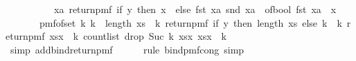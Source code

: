 \begin{isabellebody}
\ \ \ \ \ \ \ \ \ \ {\isacharparenleft}{\kern0pt}{\isasymlambda}xa{\isachardot}{\kern0pt}\ return{\isacharunderscore}{\kern0pt}pmf\ {\isacharparenleft}{\kern0pt}if\ y\ then\ {\isacharparenleft}{\kern0pt}x{\isacharcomma}{\kern0pt}\ {}{\isacharparenright}{\kern0pt}\ else\ {\isacharparenleft}{\kern0pt}fst\ xa{\isacharcomma}{\kern0pt}\ snd\ xa\ {\isacharplus}{\kern0pt}\ {\isacharparenleft}{\kern0pt}of{\isacharunderscore}{\kern0pt}bool\ {\isacharparenleft}{\kern0pt}fst\ xa\ {\isacharequal}{\kern0pt}\ x{\isacharparenright}{\kern0pt}{\isacharparenright}{\kern0pt}{\isacharparenright}{\kern0pt}{\isacharparenright}{\kern0pt}{\isacharparenright}{\kern0pt}{\isacharparenright}{\kern0pt}\isanewline
\ \ \ \ \ \ {\isacharequal}{\kern0pt}\ pmf{\isacharunderscore}{\kern0pt}of{\isacharunderscore}{\kern0pt}set\ {\isacharbraceleft}{\kern0pt}k{\isachardot}{\kern0pt}\ k\ {\isacharless}{\kern0pt}\ length\ xs{\isacharbraceright}{\kern0pt}\ {\isasymbind}\ {\isacharparenleft}{\kern0pt}{\isasymlambda}k{\isachardot}{\kern0pt}\ return{\isacharunderscore}{\kern0pt}pmf\ {\isacharparenleft}{\kern0pt}if\ y\ then\ {\isacharparenleft}{\kern0pt}length\ xs{\isacharparenright}{\kern0pt}\ else\ k{\isacharparenright}{\kern0pt}\ {\isasymbind}\ {\isacharparenleft}{\kern0pt}{\isasymlambda}k{\isachardot}{\kern0pt}\ return{\isacharunderscore}{\kern0pt}pmf\ {\isacharparenleft}{\kern0pt}{\isacharparenleft}{\kern0pt}xs{\isacharat}{\kern0pt}{\isacharbrackleft}{\kern0pt}x{\isacharbrackright}{\kern0pt}{\isacharparenright}{\kern0pt}\ {\isacharbang}{\kern0pt}\ k{\isacharcomma}{\kern0pt}\ count{\isacharunderscore}{\kern0pt}list\ {\isacharparenleft}{\kern0pt}drop\ {\isacharparenleft}{\kern0pt}Suc\ k{\isacharparenright}{\kern0pt}\ {\isacharparenleft}{\kern0pt}xs{\isacharat}{\kern0pt}{\isacharbrackleft}{\kern0pt}x{\isacharbrackright}{\kern0pt}{\isacharparenright}{\kern0pt}{\isacharparenright}{\kern0pt}\ {\isacharparenleft}{\kern0pt}{\isacharparenleft}{\kern0pt}xs{\isacharat}{\kern0pt}{\isacharbrackleft}{\kern0pt}x{\isacharbrackright}{\kern0pt}{\isacharparenright}{\kern0pt}\ {\isacharbang}{\kern0pt}\ k{\isacharparenright}{\kern0pt}{\isacharparenright}{\kern0pt}{\isacharparenright}{\kern0pt}{\isacharparenright}{\kern0pt}{\isachardoublequoteclose}\isanewline
\ \ \ \ \isamarkupfalse%
\ {\isacharparenleft}{\kern0pt}simp\ add{\isacharcolon}{\kern0pt}bind{\isacharunderscore}{\kern0pt}return{\isacharunderscore}{\kern0pt}pmf{\isacharparenright}{\kern0pt}\isanewline
\ \ \ \ \isamarkupfalse%
\ {\isacharparenleft}{\kern0pt}rule\ bind{\isacharunderscore}{\kern0pt}pmf{\isacharunderscore}{\kern0pt}cong{\isacharcomma}{\kern0pt}\ simp{\isacharparenright}{\kern0pt}\isanewline

\end{isabellebody}
